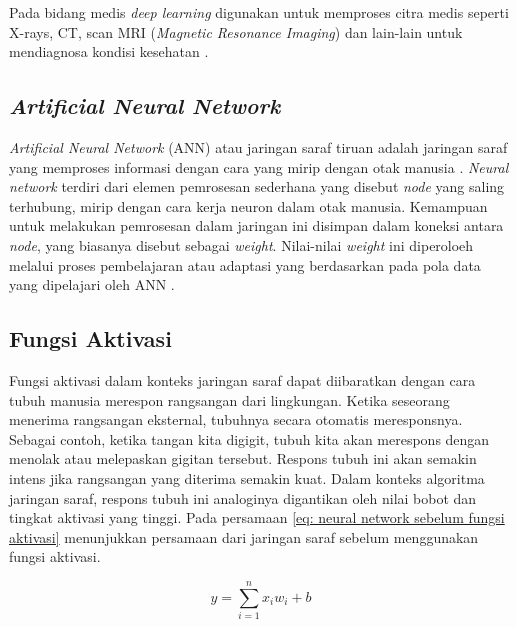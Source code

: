 \par Pada bidang medis \textit{deep learning} digunakan untuk memproses citra medis seperti X-rays, CT, scan MRI (\textit{Magnetic Resonance Imaging}) dan lain-lain untuk mendiagnosa kondisi kesehatan \citep{kelleher2019deep}.

\subsection{\textit{Artificial Neural Network}}

\par \textit{Artificial Neural Network} (ANN) atau jaringan saraf tiruan adalah jaringan saraf yang memproses informasi dengan cara yang mirip dengan otak manusia \citep{kristiyanti2023machine}. \textit{Neural network} terdiri dari elemen pemrosesan sederhana yang disebut \textit{node} yang saling terhubung, mirip dengan cara kerja neuron dalam otak manusia. Kemampuan untuk melakukan pemrosesan dalam jaringan ini disimpan dalam koneksi antara \textit{node}, yang biasanya disebut sebagai \textit{weight}. Nilai-nilai \textit{weight} ini diperoloeh melalui proses pembelajaran atau adaptasi yang berdasarkan pada pola data yang dipelajari oleh ANN \citep{gurney1997introduction}.

\subsection{Fungsi Aktivasi}


\par Fungsi aktivasi dalam konteks jaringan saraf dapat diibaratkan dengan cara tubuh manusia merespon rangsangan dari lingkungan. Ketika seseorang menerima rangsangan eksternal, tubuhnya secara otomatis meresponsnya. Sebagai contoh, ketika tangan kita digigit, tubuh kita akan merespons dengan menolak atau melepaskan gigitan tersebut. Respons tubuh ini akan semakin intens jika rangsangan yang diterima semakin kuat. Dalam konteks algoritma jaringan saraf, respons tubuh ini analoginya digantikan oleh nilai bobot dan tingkat aktivasi yang tinggi. Pada persamaan \ref{eq: neural network sebelum fungsi aktivasi} menunjukkan persamaan dari jaringan saraf sebelum menggunakan fungsi aktivasi.


\begin{equation}
    y = \sum_{i=1}^n x_i w_i + b
    \label{eq: neural network sebelum fungsi aktivasi}
\end{equation}

